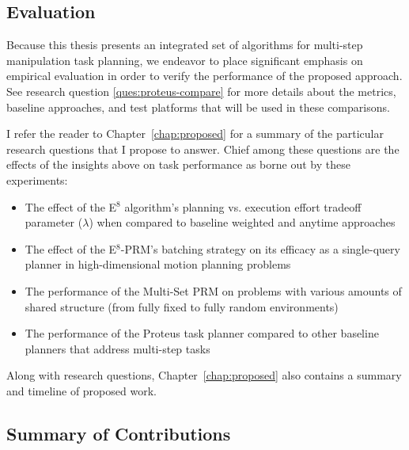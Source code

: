 \subsection*{Evaluation}

Because this thesis presents an integrated set of algorithms
for multi-step manipulation task planning,
we endeavor to place significant emphasis on empirical evaluation
in order to verify the performance of the proposed approach.
See research question \ref{ques:proteus-compare} for more details
about the metrics, baseline approaches, and test platforms
that will be used in these comparisons.

I refer the reader to Chapter~\ref{chap:proposed} for a summary
of the particular research questions that I propose to answer.
Chief among these questions are the effects of the insights above
on task performance as borne out by these experiments:
\begin{itemize}
\item The effect of the E$^8$ algorithm's planning vs. execution
   effort tradeoff parameter ($\lambda$)
   when compared to baseline weighted and anytime approaches
\item The effect of the E$^8$-PRM's batching strategy on its efficacy
   as a single-query planner in high-dimensional motion planning
   problems
\item The performance of the Multi-Set PRM on problems with various
   amounts of shared structure
   (from fully fixed to fully random environments)
\item The performance of the Proteus task planner
   compared to other baseline planners that address multi-step tasks
\end{itemize}
Along with research questions,
Chapter~\ref{chap:proposed} also contains
a summary and timeline of proposed work.

\subsection*{Summary of Contributions}

